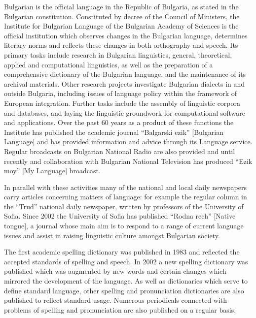 \begin{multicols}{2}
  Bulgarian is the official language in the Republic of Bulgaria, as stated in the Bulgarian constitution. Constituted by decree of the Council of Ministers, the Institute for Bulgarian Language of the Bulgarian Academy of Sciences is the official institution which observes changes in the Bulgarian language, determines literary norms and reflects these changes in both orthography and speech. Its primary tasks include research in Bulgarian linguistics, general, theoretical, applied and computational linguistics, as well as the preparation of a comprehensive dictionary of the Bulgarian language, and the maintenance of its archival materials. Other research projects investigate Bulgarian dialects in and outside Bulgaria, including issues of language policy within the framework of European integration. Further tasks include the assembly of linguistic corpora and databases, and laying the linguistic groundwork for computational software and applications. Over the past 60 years as a 
   product of these functions the Institute has published the academic journal ``Balgarski ezik'' [Bulgarian Language] and has provided information and advice through its Language service. Regular broadcasts on Bulgarian National Radio are also provided and until recently and collaboration with Bulgarian National Television has produced ``Ezik moy'' [My Language] broadcast. 

  In parallel with these activities many of the national and local daily newspapers carry articles concerning matters of language: for example the regular column in the ``Trud'' national daily newspaper, written by professors of the University of Sofia. Since 2002 the University of Sofia has published ``Rodna rech'' [Native tongue], a journal whose main aim is to respond to a range of current language issues and assist in raising linguistic culture amongst Bulgarian society. 


  The first academic spelling dictionary was published in 1983 and reflected the accepted standards of spelling and speech. In 2002 a new spelling dictionary was published which was augmented by new words and certain changes which mirrored the development of the language. As well as dictionaries which serve to define standard language, other spelling and pronunciation dictionaries are also published to reflect standard usage. Numerous periodicals connected with problems of spelling and pronunciation are also published on a regular basis. 


\end{multicols}
